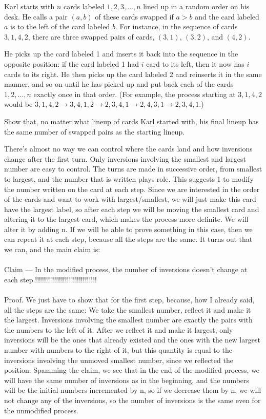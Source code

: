 \begin{example} [USAJMO 2018]
Karl starts with $n$ cards labeled $1,2,3,\dots,n$ lined up in a random order on his desk. He calls a pair $(a,b)$ of these cards swapped if $a>b$ and the card labeled $a$ is to the left of the card labeled $b$. For instance, in the sequence of cards $3,1,4,2$, there are three swapped pairs of cards, $(3,1)$, $(3,2)$, and $(4,2)$.

He picks up the card labeled 1 and inserts it back into the sequence in the opposite position: if the card labeled 1 had $i$ card to its left, then it now has $i$ cards to its right. He then picks up the card labeled $2$ and reinserts it in the same manner, and so on until he has picked up and put back each of the cards $1,2,\dots,n$ exactly once in that order. (For example, the process starting at $3,1,4,2$ would be $3,1,4,2\to 3,4,1,2\to 2,3,4,1\to 2,4,3,1\to 2,3,4,1$.)

Show that, no matter what lineup of cards Karl started with, his final lineup has the same number of swapped pairs as the starting lineup.
\end{example}

 There’s almost no way we can control where the cards land and how inversions change after the first turn. Only inversions involving the smallest and largest number are easy to control. The turns are made
 in successive order, from smallest to largest, and the number that is written plays role. This suggests 1 to modify the number written on the card at each step. Since we are interested in the order of the cards and want to work with largest/smallest, we will just make this card
 have the largest label, so after each step we will be moving the smallest card and altering it to the largest card, which makes the process more definite. We will alter it by adding n. If we will be able to prove something in this case, then we can repeat it at each step, because all the steps are the same. It turns out that we can, and the main claim is:
 \\\\
 Claim — In the modified process, the number of inversions doesn’t change at each step.!!!!!!!!!!!!!!!!!!!!!!!!!!!!!!!
 \\\\
 Proof. We just have to show that for the first step, because, how I already said, all the steps are the same: We take the smallest number, reflect it and make it the largest. Inversions involving the smallest number are exactly the pairs with the numbers to the left of it. After we reflect it and make it largest, only inversions will be the ones that already existed and the ones with the new largest number with numbers to the right of it, but this quantity is equal to the inversions involving the unmoved smallest number, since we reflected the position. Spamming the claim, we see that in the end of the modified process, we will have the same number of inversions as in the beginning, and the numbers will be the initial numbers incremented by n, so if we decrease them by n, we will not change any of the inversions, so the number of inversions is the same even for the unmodified process.

